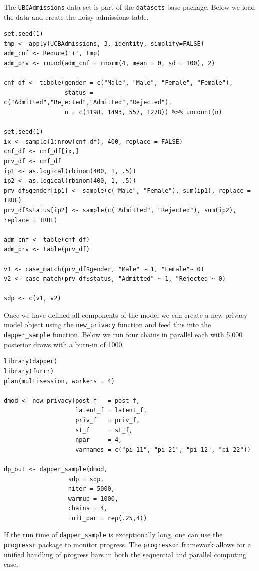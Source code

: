 The \texttt{UBCAdmissions} data set is part of the \texttt{datasets} base package.
Below we load the data and create the noisy admissions table.

\begin{verbatim}
set.seed(1)
tmp <- apply(UCBAdmissions, 3, identity, simplify=FALSE)
adm_cnf <- Reduce('+', tmp)
adm_prv <- round(adm_cnf + rnorm(4, mean = 0, sd = 100), 2)

cnf_df <- tibble(gender = c("Male", "Male", "Female", "Female"),
                 status = c("Admitted","Rejected","Admitted","Rejected"),
                 n = c(1198, 1493, 557, 1278)) %>% uncount(n)

set.seed(1) 
ix <- sample(1:nrow(cnf_df), 400, replace = FALSE)
cnf_df <- cnf_df[ix,]
prv_df <- cnf_df
ip1 <- as.logical(rbinom(400, 1, .5))
ip2 <- as.logical(rbinom(400, 1, .5))
prv_df$gender[ip1] <- sample(c("Male", "Female"), sum(ip1), replace = TRUE)
prv_df$status[ip2] <- sample(c("Admitted", "Rejected"), sum(ip2), replace = TRUE)

adm_cnf <- table(cnf_df)
adm_prv <- table(prv_df)

v1 <- case_match(prv_df$gender, "Male" ~ 1, "Female"~ 0)
v2 <- case_match(prv_df$status, "Admitted" ~ 1, "Rejected"~ 0)

sdp <- c(v1, v2)
\end{verbatim}

Once we have defined all components of the model we can
create a new privacy model object using the \texttt{new\_privacy} function and
feed this into the \texttt{dapper\_sample} function. Below we run four chains
in parallel each with 5,000 posterior draws with a burn-in of 1000.

\begin{verbatim}
library(dapper)
library(furrr)
plan(multisession, workers = 4)

dmod <- new_privacy(post_f   = post_f,
                    latent_f = latent_f,
                    priv_f   = priv_f,
                    st_f     = st_f,
                    npar     = 4,
                    varnames = c("pi_11", "pi_21", "pi_12", "pi_22"))
                  
dp_out <- dapper_sample(dmod,
                  sdp = sdp,
                  niter = 5000,
                  warmup = 1000,
                  chains = 4,
                  init_par = rep(.25,4))
\end{verbatim}

If the run time of \texttt{dapper\_sample} is exceptionally long, one can
use the \texttt{progressr} package to monitor progress. The \texttt{progressor} framework
allows for a unified handling of progress bars in both the sequential and
parallel computing case.

